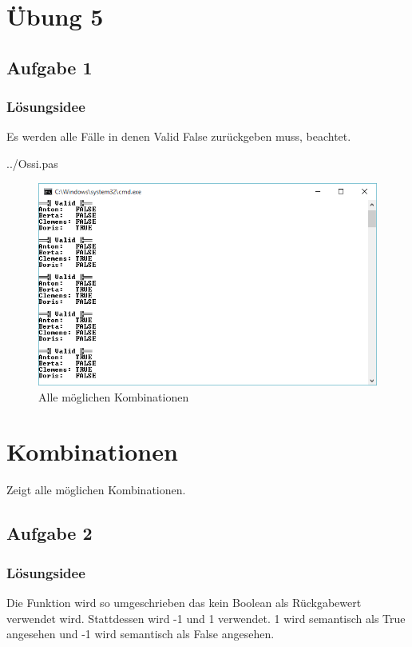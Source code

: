 \section*{Übung 5}
\subsection*{Aufgabe 1}
\subsubsection*{Lösungsidee}
Es werden alle Fälle in denen Valid False zurückgeben muss, beachtet.
\newline

 {../Ossi.pas}
\begin{figure}[H]
	\centering
	\includegraphics[scale=0.85]{./pictures/Ossi.png}
	\caption{Alle möglichen Kombinationen}
	\label{fig: Ossi Combinations}
\end{figure}

\section*{Kombinationen}
Zeigt alle möglichen Kombinationen.

\newpage

\subsection*{Aufgabe 2}
\subsubsection*{Lösungsidee}
Die Funktion wird so umgeschrieben das kein Boolean als Rückgabewert verwendet wird. Stattdessen wird -1 und 1 verwendet. 1 wird semantisch als True angesehen und -1 wird semantisch als False angesehen.
\newline

